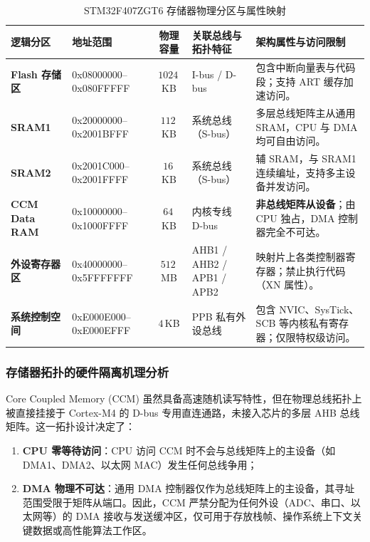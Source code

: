 \documentclass[11pt,a4paper]{ctexart}
\begin{document}
\begin{table}[H]
\centering
\caption{STM32F407ZGT6 存储器物理分区与属性映射}
\label{tab:memmap}
\begingroup\small
\begin{tabularx}{\textwidth}{@{}>{\bfseries}p{2.35cm} >{\ttfamily\footnotesize}p{3.7cm} c p{3.3cm} Y@{}}
\toprule
{}
\normalfont\bfseries 逻辑分区 & \bfseries 地址范围 & \bfseries 物理容量 & \bfseries 关联总线与拓扑特征 & \bfseries 架构属性与访问限制 \\
\midrule
Flash 存储区 & 0x08000000--0x080FFFFF & $1024\,$KB & I-bus / D-bus & 包含中断向量表与代码段；支持 ART 缓存加速访问。 \\
SRAM1 & 0x20000000--0x2001BFFF & $112\,$KB & 系统总线（S-bus） & 多层总线矩阵主从通用 SRAM，CPU 与 DMA 均可自由访问。 \\
SRAM2 & 0x2001C000--0x2001FFFF & $16\,$KB & 系统总线（S-bus） & 辅 SRAM，与 SRAM1 连续编址，支持多主设备并发访问。 \\
CCM Data RAM & 0x10000000--0x1000FFFF & $64\,$KB & 内核专线 D-bus & \textbf{非总线矩阵从设备}；由 CPU 独占，DMA 控制器完全不可达。 \\
外设寄存器区 & 0x40000000--0x5FFFFFFF & $512\,$MB & AHB1 / AHB2 / APB1 / APB2 & 映射片上各类控制器寄存器；禁止执行代码（XN 属性）。 \\
系统控制空间 & 0xE000E000--0xE000EFFF & $4\,$KB & PPB 私有外设总线 & 包含 NVIC、SysTick、SCB 等内核私有寄存器；仅限特权级访问。 \\
\bottomrule
\end{tabularx}
\endgroup
\end{table}

\subsubsection*{存储器拓扑的硬件隔离机理分析}
Core Coupled Memory (CCM) 虽然具备高速随机读写特性，但在物理总线拓扑上被直接挂接于 Cortex-M4 的 D-bus 专用直连通路，未接入芯片的多层 AHB 总线矩阵。这一拓扑设计决定了：
\begin{enumerate}[label=\textbf{(\arabic*)}]
  \item \textbf{CPU 零等待访问}：CPU 访问 CCM 时不会与总线矩阵上的主设备（如 DMA1、DMA2、以太网 MAC）发生任何总线争用；
  \item \textbf{DMA 物理不可达}：通用 DMA 控制器仅作为总线矩阵上的主设备，其寻址范围受限于矩阵从端口。因此，CCM 严禁分配为任何外设（ADC、串口、以太网等）的 DMA 接收与发送缓冲区，仅可用于存放栈帧、操作系统上下文关键数据或高性能算法工作区。
\end{enumerate}
\end{document}
